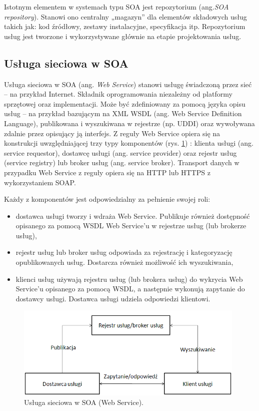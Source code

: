 Istotnym elementem w systemach typu SOA jest repozytorium (ang.\emph{SOA repository}). Stanowi ono centralny „magazyn” dla elementów składowych usług takich jak: kod źródłowy, zestawy instalacyjne, specyfikacja itp. Repozytorium usług jest tworzone i wykorzystywane głównie na etapie projektowania usług.

\subsection{Usługa sieciowa w SOA}
Usługa sieciowa w SOA (ang. \textit{Web Service}) stanowi usługę świadczoną przez sieć – na przykład Internet. Składnik oprogramowania niezależny od platformy sprzętowej oraz implementacji. Może być zdefiniowany za pomocą języka opisu usług – na przykład bazującym na XML WSDL (ang. Web Service Definition Language), publikowana i wyszukiwana w rejestrze (np. UDDI) oraz wywoływana zdalnie przez opisujący ją interfejs. 
Z reguły Web Service opiera się na konstrukcji uwzględniającej trzy typy komponentów (rys. \ref{WSArchFunc}) : klienta usługi (ang. service requestor), dostawcę usługi (ang. service provider) oraz rejestr usług (service registry) lub broker usług (ang. service broker).  Transport danych w przypadku Web Service z reguły opiera się na HTTP lub HTTPS z wykorzystaniem SOAP.

Każdy z komponentów jest odpowiedzialny za pełnienie swojej roli:
\begin{itemize}
\item{dostawca usługi tworzy i wdraża Web Service. Publikuje również dostępność opisanego za pomocą WSDL Web Service’u w rejestrze usług (lub brokerze usług),}
\item{rejestr usług lub broker usług odpowiada za rejestrację i kategoryzację opublikowanych usług. Dostarcza również możliwość ich wyszukiwania,} 
\item{klienci usług używają rejestru usług (lub brokera usług) do wykrycia Web Service’u opisanego za pomocą WSDL, a następnie wykonują zapytanie do dostawcy usługi. Dostawca usługi udziela odpowiedzi klientowi.}
\end{itemize}

\begin{figure}[h!tbp]
\begin{centering}
\includegraphics[width=11cm]{img/web_service.png}
\caption[Usługa sieciowa w SOA (Web Service).]{Usługa sieciowa w SOA (Web Service). \cite{AnRTeqq}}\label{WSArchFunc}
\end{centering}
\end{figure}

